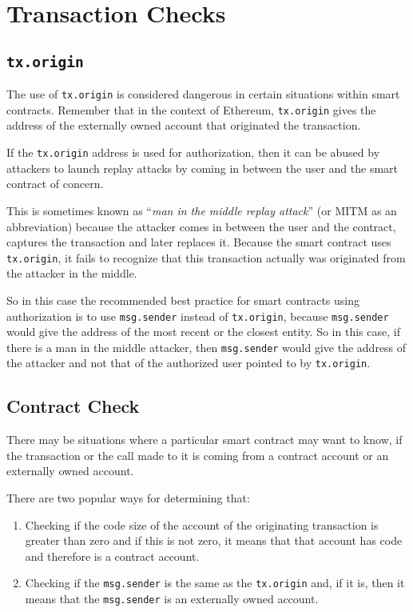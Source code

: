 \section{Transaction Checks}\label{transaction-checks}

\subsection{\texorpdfstring{\texttt{tx.origin}}{tx.origin}}\label{tx.origin}

The use of \texttt{tx.origin} is considered dangerous in certain
situations within smart contracts. Remember that in the context of
Ethereum, \texttt{tx.origin} gives the address of the externally owned
account that originated the transaction.

If the \texttt{tx.origin} address is used for authorization, then it can
be abused by attackers to launch replay attacks by coming in between the
user and the smart contract of concern.

This is sometimes known as ``\emph{man in the middle replay attack}''
(or MITM as an abbreviation) because the attacker comes in between the
user and the contract, captures the transaction and later replaces it.
Because the smart contract uses \texttt{tx.origin}, it fails to
recognize that this transaction actually was originated from the
attacker in the middle.

So in this case the recommended best practice for smart contracts using
authorization is to use \texttt{msg.sender} instead of
\texttt{tx.origin}, because \texttt{msg.sender} would give the address
of the most recent or the closest entity. So in this case, if there is a
man in the middle attacker, then \texttt{msg.sender} would give the
address of the attacker and not that of the authorized user pointed to
by \texttt{tx.origin}.

\subsection{Contract Check}\label{contract-check}

There may be situations where a particular smart contract may want to
know, if the transaction or the call made to it is coming from a
contract account or an externally owned account.

There are two popular ways for determining that:

\begin{enumerate}
\def\labelenumi{\arabic{enumi}.}
\tightlist
\item
  Checking if the code size of the account of the originating
  transaction is greater than zero and if this is not zero, it means
  that that account has code and therefore is a contract account.
\item
  Checking if the \texttt{msg.sender} is the same as the
  \texttt{tx.origin} and, if it is, then it means that the
  \texttt{msg.sender} is an externally owned account.
\end{enumerate}

